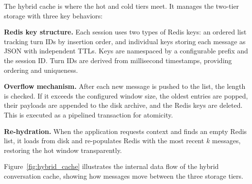 \documentclass[conference]{IEEEtran}
\begin{document}
The hybrid cache is where the hot and cold tiers meet. It manages the two-tier storage with three key behaviors:

\textbf{Redis key structure.} Each session uses two types of Redis keys: an ordered list tracking turn IDs by insertion order, and individual keys storing each message as JSON with independent TTLs. Keys are namespaced by a configurable prefix and the session ID. Turn IDs are derived from millisecond timestamps, providing ordering and uniqueness.

\textbf{Overflow mechanism.} After each new message is pushed to the list, the length is checked. If it exceeds the configured window size, the oldest entries are popped, their payloads are appended to the disk archive, and the Redis keys are deleted. This is executed as a pipelined transaction for atomicity.

\textbf{Re-hydration.} When the application requests context and finds an empty Redis list, it loads from disk and re-populates Redis with the most recent $k$ messages, restoring the hot window transparently.

Figure~\ref{fig:hybrid_cache} illustrates the internal data flow of the hybrid conversation cache, showing how messages move between the three storage tiers.
\end{document}
